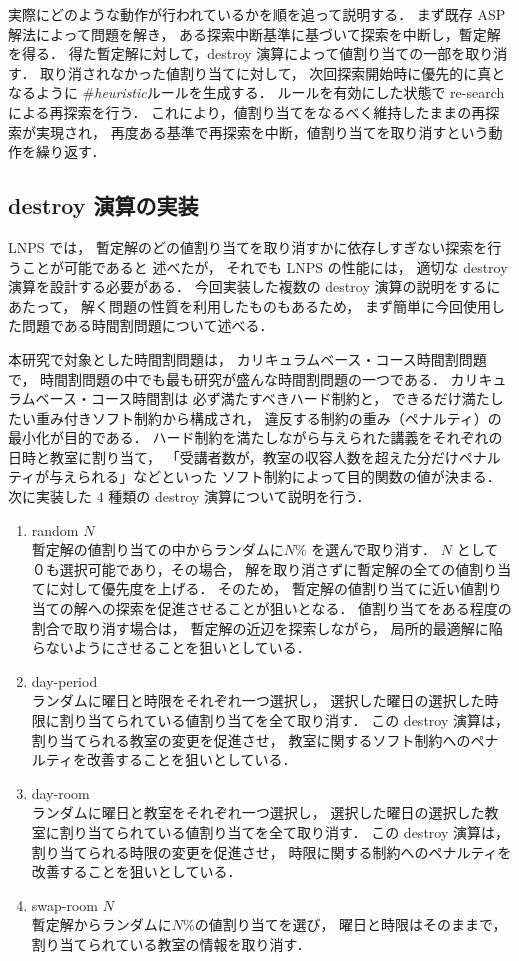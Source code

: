 実際にどのような動作が行われているかを順を追って説明する．
まず既存 ASP 解法によって問題を解き，
ある探索中断基準に基づいて探索を中断し，暫定解を得る．
得た暫定解に対して，destroy 演算によって値割り当ての一部を取り消す．
取り消されなかった値割り当てに対して，
次回探索開始時に優先的に真となるように
\#\textit{heuristic}ルールを生成する．
ルールを有効にした状態で re-search による再探索を行う．
これにより，値割り当てをなるべく維持したままの再探索が実現され，
再度ある基準で再探索を中断，値割り当てを取り消すという動作を繰り返す．

\subsection{destroy 演算の実装}
LNPS では，
暫定解のどの値割り当てを取り消すかに依存しすぎない探索を行うことが可能であると
述べたが，
それでも LNPS の性能には，
適切な destroy 演算を設計する必要がある．
今回実装した複数の destroy 演算の説明をするにあたって，
解く問題の性質を利用したものもあるため，
まず簡単に今回使用した問題である時間割問題について述べる．

本研究で対象とした時間割問題は，
カリキュラムベース・コース時間割問題で，
時間割問題の中でも最も研究が盛んな時間割問題の一つである．
カリキュラムベース・コース時間割は
必ず満たすべきハード制約と，
できるだけ満たしたい重み付きソフト制約から構成され，
違反する制約の重み（ペナルティ）の最小化が目的である．
ハード制約を満たしながら与えられた講義をそれぞれの日時と教室に割り当て，
「受講者数が，教室の収容人数を超えた分だけペナルティが与えられる」などといった
ソフト制約によって目的関数の値が決まる．\\

次に実装した 4 種類の destroy 演算について説明を行う．
    \begin{enumerate}
    \item random $N$\\
       暫定解の値割り当ての中からランダムに$N$\% を選んで取り消す．
       $N$ として０も選択可能であり，その場合，
       解を取り消さずに暫定解の全ての値割り当てに対して優先度を上げる．
       そのため，
       暫定解の値割り当てに近い値割り当ての解への探索を促進させることが狙いとなる．
       値割り当てをある程度の割合で取り消す場合は，
       暫定解の近辺を探索しながら，
       局所的最適解に陥らないようにさせることを狙いとしている．
    \item day-period\\
      ランダムに曜日と時限をそれぞれ一つ選択し，
      選択した曜日の選択した時限に割り当てられている値割り当てを全て取り消す．
      この destroy 演算は，
      割り当てられる教室の変更を促進させ，
      教室に関するソフト制約へのペナルティを改善することを狙いとしている．
  \item day-room\\
   ランダムに曜日と教室をそれぞれ一つ選択し，
   選択した曜日の選択した教室に割り当てられている値割り当てを全て取り消す．
   この destroy 演算は，
   割り当てられる時限の変更を促進させ，
   時限に関する制約へのペナルティを改善することを狙いとしている．
  \item swap-room $N$\\
    暫定解からランダムに$N$\%の値割り当てを選び，
    曜日と時限はそのままで，割り当てられている教室の情報を取り消す．
  \end{enumerate}